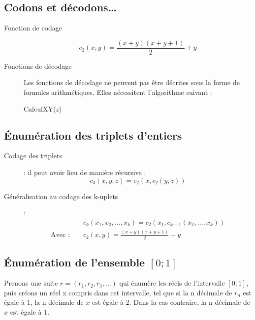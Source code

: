 \subsection{Codons et décodons\ldots}
\begin{description}
\item[Fonction de codage]
\[ c_2(x,y)= \frac{(x+y)(x+y+1)}{2}+y \]

\item[Fonctions de décodage]
Les fonctions de décodage ne peuvent pas être décrites sous la forme de formules arithmétiques. Elles nécessitent l'algorithme suivant :

\begin{algorithm}[H]
  \caption{CalculXY($z$)}
\end{algorithm}
\end{description}

\subsection{Énumération des triplets d'entiers}
\begin{description}
\item[Codage des triplets] : il peut avoir lieu de manière récursive :
\[ c_3(x,y,z)=c_2(x,c_2(y,z)) \]
\item[Généralisation au codage des k-uplets] : 
\begin{eqnarray*}
& &c_k(x_1,x_2,\ldots,x_k)=c_2(x_1,c_{k-1}(x_2,\ldots,x_k)) \\
\textrm{Avec : } & &c_2(x,y)=\frac{(x+y)(x+y+1)}{2}+y
\end{eqnarray*}



\end{description}

\subsection{Énumération de l'ensemble $[0;1]$}
Prenons une suite $r=(r_1,r_2,r_3,\ldots)$ qui énumère les réels de l'intervalle $[0;1]$, puis créons un réel x compris dans cet intervalle, tel que si la n décimale de $r_n$ est égale à $1$, la n décimale de $x$ est égale à 2. Dans la cas contraire, la n décimale de $x$ est égale à 1.

